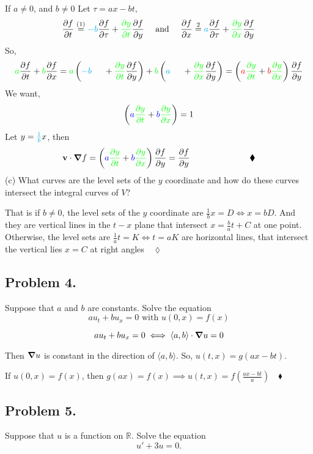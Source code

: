 \documentclass{article}
\newcommand\R{\mathbb{R}}
\begin{document}
If $a\neq 0$, and $b\neq 0$ Let $\tau = ax - bt,$
\[\pdv{f}{t} \overset{(1)}{=}  {\color{cyan} -b}\pdv{f}{\tau}
  +{\color{green}\pdv{y}{t}}\pdv{f}{y}\quad \text{ and }\quad \pdv{f}{x} \overset{2}{=}  {\color{cyan} a}\pdv{f}{\tau} +{\color{green}
    \pdv{y}{x}}\pdv{f}{y}\]
So,
\[{\color{green}a}\pdv{f}{t} +{\color{green} b}\pdv{f}{x} =
  {\color{green}a}\left(  {\color{cyan} -b}{\color{white}\pdv{f}{\tau}}
    +{\color{green}\pdv{y}{t}}\pdv{f}{y}\right) +{\color{green}
    b}\left(  {\color{cyan} a}{\color{white} \pdv{f}{\tau}}
    +{\color{green}\pdv{y}{x}}\pdv{f}{y}\right) =
  \left({\color{red}a}{\color{green}\pdv{y}{t}}
    +{\color{red}b}{\color{green}\pdv{y}{x}}\right)\pdv{f}{y}\]
We want,\[\left({\color{blue}a}{\color{green}\pdv{y}{t}}
    +{\color{blue}b}{\color{green}\pdv{y}{x}}\right) = 1\]
Let $y = {\color{cyan} \frac{1}{b}}x$, then
\[\vb{v}\cdot \grad{f} = \left({\color{blue}a}{\color{green}\pdv{y}{t}}
    +{\color{blue}b}{\color{green}\pdv{y}{x}}\right) \pdv{f}{y} =
  \pdv{f}{y} \hspace{7em}\blacklozenge\]
\newpage
(c) What curves are the level sets of the $y$ coordinate and how do these curves intersect the
integral curves of $V$?

That is if $b\neq 0$, the level sets of the $y$ coordinate are $\frac{1}{b}x = D \iff x =
bD$. And they are vertical lines in the $t-x$ plane that intersect $x =
\frac{b}{a}t+C$ at one point. Otherwise, the level sets
are $\frac{1}{a}t = K\iff t = aK$ are  horizontal lines, that
intersect the vertical lies $x = C$ at right angles$\quad\lozenge$

\subsection*{Problem 4.} Suppose that $a$ and $b$ are constants. Solve
the equation
\[au_t+bu_x = 0\text{ with } u(0,x) = f(x)\]

\[au_t+bu_x = 0\iff \langle a,b \rangle\cdot \grad{u} = 0\]

Then $\grad{u}$ is constant in the direction of $\langle a,b
\rangle$. So, $u(t,x) = g(ax - bt)$.

If $u(0,x) = f(x)$, then $g(ax) =
f(x) \implies u(t,x) = f(\frac{ax-bt}{a})\quad \blacklozenge$

\subsection*{Problem 5.} Suppose that $u$ is a function on $\R$. Solve the equation
\[u' + 3u = 0.\]
\end{document}
